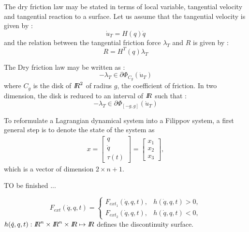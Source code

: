 \documentclass[10pt]{article}
\begin{document}
The dry friction law may be stated in terms of local variable, tangential velocity and tangential reaction to a surface. Let us assume that the tangential velocity is given by :
\begin{equation}
  \dot u_T = H(q) \dot q
\end{equation}
and the relation between the tangential friction force $\lambda_T$ and $R$ is given by :
\begin{equation}
  R= H^{T}(q) \lambda_T
\end{equation}

The Dry friction law may be written as :
\begin{equation}
  - \lambda_T \in \partial \Phi_{C_{g}}(\dot u_T)
\end{equation}
where $C_g$ is the disk of $\mbox{\rm $I\!\!R$}^2$ of radius $g$, the coefficient of friction. In two dimension, the disk is reduced to an interval of $\mbox{\rm $I\!\!R$}$ such that :
\begin{equation}
  - \lambda_T \in \partial \Phi_{[-g,g]}(\dot u_T)
\end{equation}






To reformulate a Lagrangian dynamical system into a Filippov system, a first general step is to denote the state of the system as 
\begin{eqnarray}
  x =  \left[\begin{array}{c}
  q \\
  \dot q \\
  \tau(t)
  \end{array}\right] =
  \left[\begin{array}{c}
  x_1 \\
  x_2 \\
  x_3
  \end{array}\right], 
\end{eqnarray}
which is a vector of dimension $2\times n+1$.

\begin{ndrva}
  TO be finished ...
\end{ndrva}

\begin{equation}
\label{eq:F_ext}
F_{ext}(\dot q, q, t) = \left\{\begin{array}{ll} 
F_{ext_1}(\dot q, q, t), & h(\dot q,q,t) > 0, \\
F_{ext_2}(\dot q, q, t), & h(\dot q,q,t) < 0,
\end{array}\right.
\end{equation}
 $h(\dot q, q, t):  \RR^n \times \RR^n \times \RR \mapsto \mathcal \RR$  defines the discontinuity surface.
\end{document}
